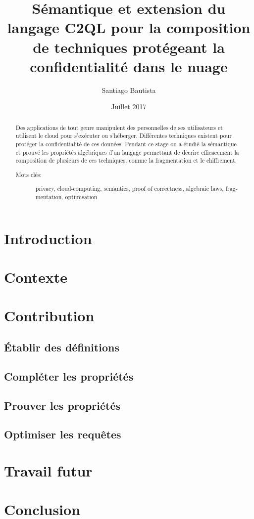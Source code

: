 \documentclass[a4paper,11pt]{article}
\author{Santiago Bautista}
\date{Juillet 2017}
\title{Sémantique et extension du langage C2QL pour la composition de techniques protégeant la confidentialité dans le nuage}
\begin{document}
\maketitle

\begin{abstract}
	Des applications de tout genre manipulent des personnelles de ses utilisateurs
	et utilisent le cloud pour s'exécuter ou s'héberger.
	Différentes techniques existent pour protéger la confidentialité de ces données.
	Pendant ce stage on a étudié la sémantique et prouvé les propriétés algébriques d'un langage permettant de décrire
	efficacement la composition de plusieurs de ces techniques, comme la fragmentation et le chiffrement.
	\begin{description}
		\item[Mots clés:]{\begin{otherlanguage}{english}
				privacy, cloud-computing, semantics, proof of correctness, algebraic laws, fragmentation, optimisation
			\end{otherlanguage}} 
	\end{description} 
	
\end{abstract}

\tableofcontents
\pagebreak

\section{Introduction}


\section{Contexte}
\label{context}


\section{Contribution}


\subsection{Établir des définitions}
\label{defs}


\subsection{Compléter les propriétés}
\label{compl}


\subsection{Prouver les propriétés}
\label{proof}


\subsection{Optimiser les requêtes}
\label{opti}


\section{Travail futur}
\label{discusion}


\section{Conclusion}


 \newpage
 \appendix
\end{document}
